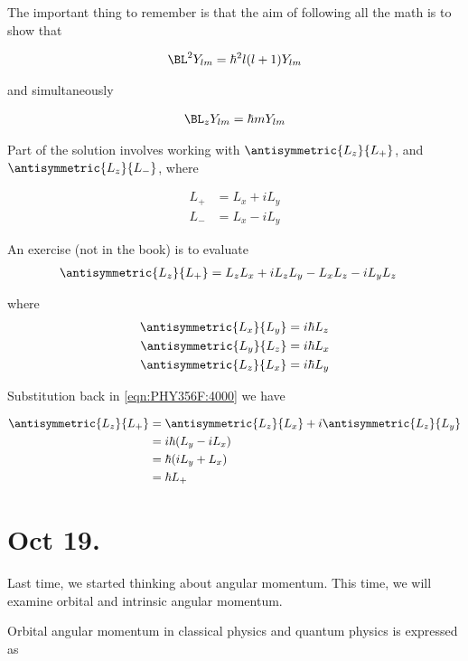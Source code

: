 The important thing to remember is that the aim of following all the math is to show that

\begin{align*}
\BL^2 Y_{lm} = \hbar^2 l (l+1) Y_{lm}
\end{align*}

and simultaneously

\begin{align*}
\BL_z Y_{lm} = \hbar m Y_{lm}
\end{align*}

Part of the solution involves working with $\antisymmetric{L_z}{L_{+}}$, and $\antisymmetric{L_z}{L_{-}}$, where

\begin{align*}
L_{+} &= L_x + i L_y \\
L_{-} &= L_x - i L_y
\end{align*}

An exercise (not in the book) is to evaluate
\begin{align}\label{eqn:PHY356F:4000}
\antisymmetric{L_z}{L_{+}}
&= L_z L_x + i L_z L_y - L_x L_z - i L_y L_z
\end{align}

where
\begin{align}\label{eqn:PHY356F:5000}
\antisymmetric{L_x}{L_y}  &= i \hbar L_z \\
\antisymmetric{L_y}{L_z}  &= i \hbar L_x \\
\antisymmetric{L_z}{L_x}  &= i \hbar L_y
\end{align}

Substitution back in \ref{eqn:PHY356F:4000} we have

\begin{align*}
\antisymmetric{L_z}{L_{+}}
&=
\antisymmetric{L_z}{L_x}
+ i \antisymmetric{L_z}{L_y}  \\
&=
i \hbar ( L_y - i L_x ) \\
&=
\hbar ( i L_y +  L_x ) \\
&=
\hbar L_{+}
\end{align*}

\section{Oct 19.}

Last time, we started thinking about angular momentum.  This time, we will examine orbital and intrinsic angular momentum.

Orbital angular momentum in classical physics and quantum physics is expressed as

